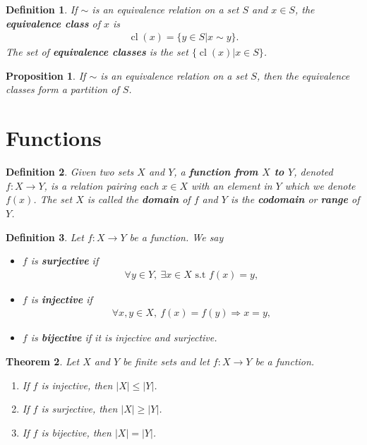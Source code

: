 \documentclass{article}
\theoremstyle{sltheorem}
\newtheorem{definition}{Definition}[section]
\newtheorem{theorem}{Theorem}[section]
\newtheorem{proposition}[theorem]{Proposition}
\newcommand{\st}{\text{ s.t }}
\DeclareMathOperator{\cl}{cl}
\begin{document}
\begin{definition}
    If $\sim$ is an equivalence relation on a set $S$ and $x\in S$, the \textbf{equivalence class} of $x$ is
    \begin{align*}
        \cl(x) = \{y\in S | x\sim y\}.
    \end{align*}
    The set of \textbf{equivalence classes} is the set $\{\cl(x) | x \in S\}$.
\end{definition}
\begin{proposition}
    If $\sim$ is an equivalence relation on a set $S$, then the equivalence classes form a partition of $S$. 
\end{proposition}
\section{Functions}
\begin{definition}
    Given two sets $X$ and $Y$, a \textbf{function from $X$ to $Y$}, denoted $f:X\to Y$, is a relation pairing each $x\in X$ with an element in $Y$ which we denote $f(x)$. The set $X$ is called the \textbf{domain} of $f$ and $Y$ is the \textbf{codomain} or \textbf{range} of $Y$.
\end{definition}
\begin{definition}
    Let $f:X\to Y$ be a function. We say
    \begin{itemize}
        \item $f$ is \textbf{surjective} if
        \begin{align*}
            \forall y \in Y,\: \exists x \in X \st f(x) = y,
        \end{align*}
        \item $f$ is \textbf{injective} if
        \begin{align*}
            \forall x,y \in X,\: f(x)=f(y) \Rightarrow x = y,
        \end{align*}
        \item $f$ is \textbf{bijective} if it is injective and surjective.
    \end{itemize}
\end{definition}
\begin{theorem}
    Let $X$ and $Y$ be finite sets and let $f:X\to Y$ be a function.
    \begin{enumerate}
        \item If $f$ is injective, then $|X|\leq |Y|$.
        \item If $f$ is surjective, then $|X|\geq |Y|$.
        \item If $f$ is bijective, then $|X|=|Y|$.
    \end{enumerate}
\end{theorem}
\end{document}
